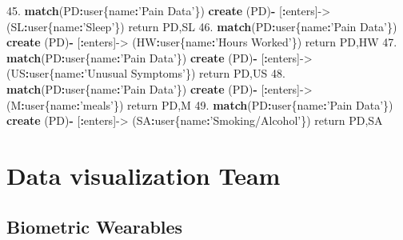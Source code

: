 \documentclass[]{book}
\newenvironment{Shaded}{\begin{snugshade}}{\end{snugshade}}
\newcommand{\KeywordTok}[1]{\textcolor[rgb]{0.13,0.29,0.53}{\textbf{#1}}}
\newcommand{\FloatTok}[1]{\textcolor[rgb]{0.00,0.00,0.81}{#1}}
\newcommand{\StringTok}[1]{\textcolor[rgb]{0.31,0.60,0.02}{#1}}
\newcommand{\OperatorTok}[1]{\textcolor[rgb]{0.81,0.36,0.00}{\textbf{#1}}}
\newcommand{\NormalTok}[1]{#1}
\begin{document}
\begin{Shaded}
\begin{Highlighting}[]
\FloatTok{45.} \KeywordTok{match}\NormalTok{(PD}\OperatorTok{:}\NormalTok{user\{name}\OperatorTok{:}\StringTok{'Pain Data'}\NormalTok{\}) }\KeywordTok{create}\NormalTok{ (PD)}\OperatorTok{-}\StringTok{ }\NormalTok{[}\OperatorTok{:}\NormalTok{enters]->}\StringTok{ }\NormalTok{(SL}\OperatorTok{:}\NormalTok{user\{name}\OperatorTok{:}\StringTok{'Sleep'}\NormalTok{\}) return PD,SL}
\FloatTok{46.} \KeywordTok{match}\NormalTok{(PD}\OperatorTok{:}\NormalTok{user\{name}\OperatorTok{:}\StringTok{'Pain Data'}\NormalTok{\}) }\KeywordTok{create}\NormalTok{ (PD)}\OperatorTok{-}\StringTok{ }\NormalTok{[}\OperatorTok{:}\NormalTok{enters]->}\StringTok{ }\NormalTok{(HW}\OperatorTok{:}\NormalTok{user\{name}\OperatorTok{:}\StringTok{'Hours Worked'}\NormalTok{\}) return PD,HW}
\FloatTok{47.} \KeywordTok{match}\NormalTok{(PD}\OperatorTok{:}\NormalTok{user\{name}\OperatorTok{:}\StringTok{'Pain Data'}\NormalTok{\}) }\KeywordTok{create}\NormalTok{ (PD)}\OperatorTok{-}\StringTok{ }\NormalTok{[}\OperatorTok{:}\NormalTok{enters]->}\StringTok{ }\NormalTok{(US}\OperatorTok{:}\NormalTok{user\{name}\OperatorTok{:}\StringTok{'Unusual Symptoms'}\NormalTok{\}) return PD,US}
\FloatTok{48.} \KeywordTok{match}\NormalTok{(PD}\OperatorTok{:}\NormalTok{user\{name}\OperatorTok{:}\StringTok{'Pain Data'}\NormalTok{\}) }\KeywordTok{create}\NormalTok{ (PD)}\OperatorTok{-}\StringTok{ }\NormalTok{[}\OperatorTok{:}\NormalTok{enters]->}\StringTok{ }\NormalTok{(M}\OperatorTok{:}\NormalTok{user\{name}\OperatorTok{:}\StringTok{'meals'}\NormalTok{\}) return PD,M}
\FloatTok{49.} \KeywordTok{match}\NormalTok{(PD}\OperatorTok{:}\NormalTok{user\{name}\OperatorTok{:}\StringTok{'Pain Data'}\NormalTok{\}) }\KeywordTok{create}\NormalTok{ (PD)}\OperatorTok{-}\StringTok{ }\NormalTok{[}\OperatorTok{:}\NormalTok{enters]->}\StringTok{ }\NormalTok{(SA}\OperatorTok{:}\NormalTok{user\{name}\OperatorTok{:}\StringTok{'Smoking/Alcohol'}\NormalTok{\}) return PD,SA}
\end{Highlighting}
\end{Shaded}

\chapter{Data visualization Team}\label{data-visualization-team}

\section{Biometric Wearables}\label{biometric-wearables}
\end{document}
